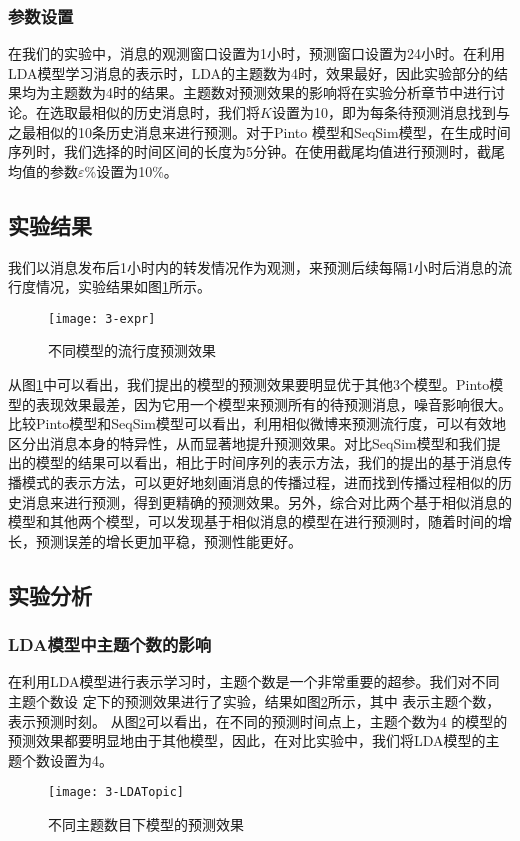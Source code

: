 \subsubsection{参数设置}
在我们的实验中，消息的观测窗口设置为1小时，预测窗口设置为24小时。在利用LDA模型学习消息的表示时，LDA的主题数为4时，效果最好，因此实验部分的结果均为主题数为4时的结果。主题数对预测效果的影响将在实验分析章节中进行讨论。在选取最相似的历史消息时，我们将$K$设置为10，即为每条待预测消息找到与之最相似的10条历史消息来进行预测。对于Pinto 模型和SeqSim模型，在生成时间序列时，我们选择的时间区间的长度为5分钟。在使用截尾均值进行预测时，截尾均值的参数$\varepsilon$\%设置为10\%。
\subsection{实验结果}
我们以消息发布后1小时内的转发情况作为观测，来预测后续每隔1小时后消息的流行度情况，实验结果如图\ref{fig:exprResult}所示。
\begin{figure}[!htbp]
  \centering
  \texttt{[image: 3-expr]}
  \caption{不同模型的流行度预测效果}
  \label{fig:exprResult}
\end{figure}


从图\ref{fig:exprResult}中可以看出，我们提出的模型的预测效果要明显优于其他3个模型。Pinto模型的表现效果最差，因为它用一个模型来预测所有的待预测消息，噪音影响很大。比较Pinto模型和SeqSim模型可以看出，利用相似微博来预测流行度，可以有效地区分出消息本身的特异性，从而显著地提升预测效果。对比SeqSim模型和我们提出的模型的结果可以看出，相比于时间序列的表示方法，我们的提出的基于消息传播模式的表示方法，可以更好地刻画消息的传播过程，进而找到传播过程相似的历史消息来进行预测，得到更精确的预测效果。另外，综合对比两个基于相似消息的模型和其他两个模型，可以发现基于相似消息的模型在进行预测时，随着时间的增长，预测误差的增长更加平稳，预测性能更好。
\subsection{实验分析}
\subsubsection{LDA模型中主题个数的影响}
在利用LDA模型进行表示学习时，主题个数是一个非常重要的超参。我们对不同主题个数设
定下的预测效果进行了实验，结果如图\ref{fig:ldaTopic}所示，其中 表示主题个数， 表示预测时刻。
从图\ref{fig:ldaTopic}可以看出，在不同的预测时间点上，主题个数为4 的模型的预测效果都要明显地由于其他模型，因此，在对比实验中，我们将LDA模型的主题个数设置为4。
\begin{figure}[!htbp]
  \centering
  \texttt{[image: 3-LDATopic]}
  \caption{不同主题数目下模型的预测效果}
  \label{fig:ldaTopic}
\end{figure}

